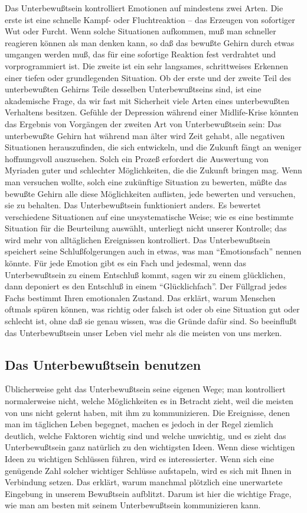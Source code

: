 Das Unterbewußtsein kontrolliert Emotionen auf mindestens zwei Arten.
Die erste ist eine schnelle Kampf- oder Fluchtreaktion -- das Erzeugen von sofortiger Wut oder Furcht.
Wenn solche Situationen aufkommen, muß man schneller reagieren können als man denken kann, so daß das bewußte Gehirn durch etwas umgangen werden muß, das für eine sofortige Reaktion fest verdrahtet und vorprogrammiert ist.
Die zweite ist ein sehr langsames, schrittweises Erkennen einer tiefen oder grundlegenden Situation.
Ob der erste und der zweite Teil des unterbewußten Gehirns Teile desselben Unterbewußtseins sind, ist eine akademische Frage, da wir fast mit Sicherheit viele Arten eines unterbewußten Verhaltens besitzen.
Gefühle der Depression während einer Midlife-Krise könnten das Ergebnis von Vorgängen der zweiten Art von Unterbewußtsein sein: Das unterbewußte Gehirn hat während man älter wird Zeit gehabt, alle negativen Situationen herauszufinden, die sich entwickeln, und die Zukunft fängt an weniger hoffnungsvoll auszusehen.
Solch ein Prozeß erfordert die Auswertung von Myriaden guter und schlechter Möglichkeiten, die die Zukunft bringen mag.
Wenn man versuchen wollte, solch eine zukünftige Situation zu bewerten, müßte das bewußte Gehirn alle diese Möglichkeiten auflisten, jede bewerten und versuchen, sie zu behalten.
Das Unterbewußtsein funktioniert anders.
Es bewertet verschiedene Situationen auf eine unsystematische Weise; wie es eine bestimmte Situation für die Beurteilung auswählt, unterliegt nicht unserer Kontrolle; das wird mehr von alltäglichen Ereignissen kontrolliert.
Das Unterbewußtsein speichert seine Schlußfolgerungen auch in etwas, was man \enquote{Emotionsfach} nennen könnte.
Für jede Emotion gibt es ein Fach und jedesmal, wenn das Unterbewußtsein zu einem Entschluß kommt, sagen wir zu einem glücklichen, dann deponiert es den Entschluß in einem \enquote{Glücklichfach}.
Der Füllgrad jedes Fachs bestimmt Ihren emotionalen Zustand.
Das erklärt, warum Menschen oftmals spüren können, was richtig oder falsch ist oder ob eine Situation gut oder schlecht ist, ohne daß sie genau wissen, was die Gründe dafür sind.
So beeinflußt das Unterbewußtsein unser Leben viel mehr als die meisten von uns merken.


\subsection{Das Unterbewußtsein benutzen}
\label{c3_6c}

Üblicherweise geht das Unterbewußtsein seine eigenen Wege; man kontrolliert normalerweise nicht, welche Möglichkeiten es in Betracht zieht, weil die meisten von uns nicht gelernt haben, mit ihm zu kommunizieren.
Die Ereignisse, denen man im täglichen Leben begegnet, machen es jedoch in der Regel ziemlich deutlich, welche Faktoren wichtig sind und welche unwichtig, und es zieht das Unterbewußtsein ganz natürlich zu den wichtigsten Ideen.
Wenn diese wichtigen Ideen zu wichtigen Schlüssen führen, wird es interessierter.
Wenn sich eine genügende Zahl solcher wichtiger Schlüsse aufstapeln, wird es sich mit Ihnen in Verbindung setzen.
Das erklärt, warum manchmal plötzlich eine unerwartete Eingebung in unserem Bewußtsein aufblitzt.
Darum ist hier die wichtige Frage, wie man am besten mit seinem Unterbewußtsein kommunizieren kann.

